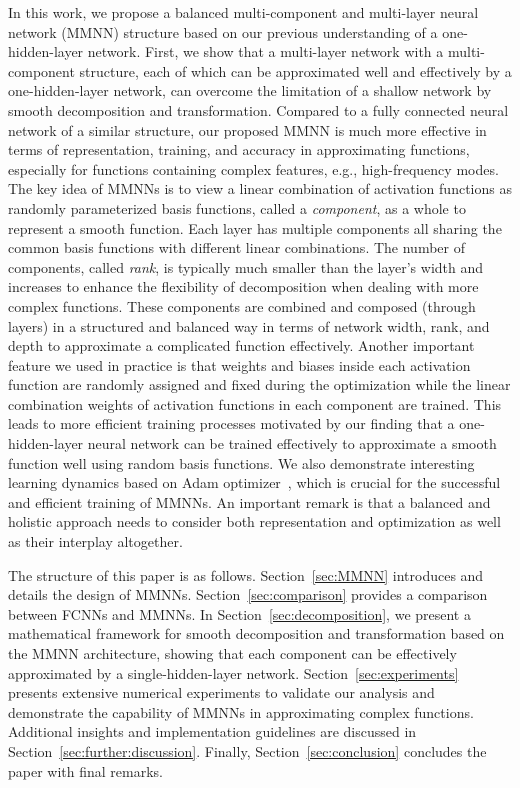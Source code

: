\documentclass[review,hidelinks,onefignum,onetabnum]{siamart250211}
\begin{document}
In this work, we propose a balanced multi-component and multi-layer neural network (MMNN) structure based on our previous understanding of a one-hidden-layer network. First, we show that a multi-layer network with a multi-component structure, each of which can be approximated well and effectively by a one-hidden-layer network, can overcome the limitation of a shallow network by smooth decomposition and transformation. Compared to a fully connected neural network of a similar structure, our proposed MMNN is much more effective in terms of representation, training, and accuracy in approximating functions, especially for functions containing complex features, e.g., high-frequency modes. The key idea of MMNNs is to view a linear combination of activation functions as randomly parameterized basis functions, called a \emph{component},  as a whole to represent a smooth function. Each layer has multiple components all sharing the common basis functions with different linear combinations. The number of components, called \emph{rank}, is typically much smaller than the layer's width and increases to enhance the flexibility of decomposition when dealing with more complex functions. These components are combined and composed (through layers) in a structured and balanced way in terms of network width, rank, and depth to approximate a complicated function effectively. 
Another important feature we used in practice is that weights and biases inside each activation function are randomly assigned and fixed during the optimization while the linear combination weights of activation functions in each component are trained. This leads to more efficient training processes motivated by our finding that a one-hidden-layer neural network can be trained effectively to approximate a smooth function well using random basis functions. We also demonstrate interesting learning dynamics based on Adam optimizer~\cite{DBLP:journals/corr/KingmaB14}, which is crucial for the successful and efficient training of MMNNs. An important remark is that a balanced and holistic approach needs to consider both representation and optimization as well as their interplay altogether. 


The structure of this paper is as follows. Section~\ref{sec:MMNN} introduces and details the design of MMNNs. Section~\ref{sec:comparison} provides a comparison between FCNNs and MMNNs. In Section~\ref{sec:decomposition}, we present a mathematical framework for smooth decomposition and transformation based on the MMNN architecture, showing that each component can be effectively approximated by a single-hidden-layer network. Section~\ref{sec:experiments} presents extensive numerical experiments to validate our analysis and demonstrate the capability of MMNNs in approximating complex functions. Additional insights and implementation guidelines are discussed in Section~\ref{sec:further:discussion}. Finally, Section~\ref{sec:conclusion} concludes the paper with final remarks.
\end{document}
